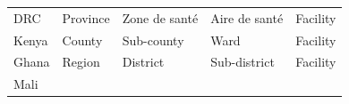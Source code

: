 \documentclass[]{book}
\begin{document}
\begin{longtable}[]{@{}lllll@{}}
\begin{minipage}[t]{0.07\columnwidth}\raggedright
DRC\strut
\end{minipage} & \begin{minipage}[t]{0.20\columnwidth}\raggedright
Province\strut
\end{minipage} & \begin{minipage}[t]{0.20\columnwidth}\raggedright
Zone de santé\strut
\end{minipage} & \begin{minipage}[t]{0.20\columnwidth}\raggedright
Aire de santé\strut
\end{minipage} & \begin{minipage}[t]{0.20\columnwidth}\raggedright
Facility\strut
\end{minipage}\tabularnewline
\begin{minipage}[t]{0.07\columnwidth}\raggedright
Kenya\strut
\end{minipage} & \begin{minipage}[t]{0.20\columnwidth}\raggedright
County\strut
\end{minipage} & \begin{minipage}[t]{0.20\columnwidth}\raggedright
Sub-county\strut
\end{minipage} & \begin{minipage}[t]{0.20\columnwidth}\raggedright
Ward\strut
\end{minipage} & \begin{minipage}[t]{0.20\columnwidth}\raggedright
Facility\strut
\end{minipage}\tabularnewline
\begin{minipage}[t]{0.07\columnwidth}\raggedright
Ghana\strut
\end{minipage} & \begin{minipage}[t]{0.20\columnwidth}\raggedright
Region\strut
\end{minipage} & \begin{minipage}[t]{0.20\columnwidth}\raggedright
District\strut
\end{minipage} & \begin{minipage}[t]{0.20\columnwidth}\raggedright
Sub-district\strut
\end{minipage} & \begin{minipage}[t]{0.20\columnwidth}\raggedright
Facility\strut
\end{minipage}\tabularnewline
\begin{minipage}[t]{0.07\columnwidth}\raggedright
Mali\strut
\end{minipage} & \begin{minipage}[t]{0.20\columnwidth}\raggedright

\end{minipage}
\end{longtable}
\end{document}
